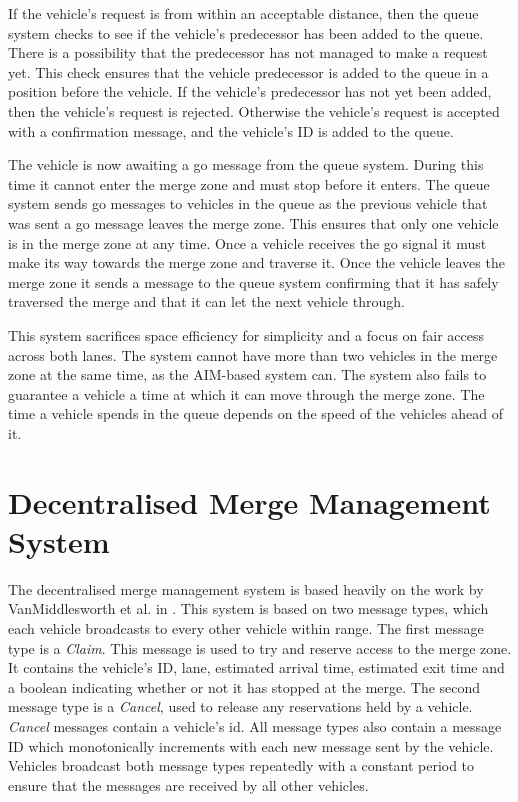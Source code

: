 If the vehicle's request is from within an acceptable distance, then the queue system checks to see if the vehicle's predecessor has been added to the queue. There is a possibility that the predecessor has not managed to make a request yet. This check ensures that the vehicle predecessor is added to the queue in a position before the vehicle. If the vehicle's predecessor has not yet been added, then the vehicle's request is rejected. Otherwise the vehicle's request is accepted with a confirmation message, and the vehicle's ID is added to the queue.

The vehicle is now awaiting a go message from the queue system. During this time it cannot enter the merge zone and must stop before it enters. The queue system sends go messages to vehicles in the queue as the previous vehicle that was sent a go message leaves the merge zone. This ensures that only one vehicle is in the merge zone at any time. Once a vehicle receives the go signal it must make its way towards the merge zone and traverse it. Once the vehicle leaves the merge zone it sends a message to the queue system confirming that it has safely traversed the merge and that it can let the next vehicle through.

This system sacrifices space efficiency for simplicity and a focus on fair access across both lanes. The system cannot have more than two vehicles in the merge zone at the same time, as the AIM-based system can. The system also fails to guarantee a vehicle a time at which it can move through the merge zone. The time a vehicle spends in the queue depends on the speed of the vehicles ahead of it.

\section{Decentralised Merge Management System}
\label{sec:Decentralised Merge Management System}
The decentralised merge management system is based heavily on the work by VanMiddlesworth et al. in  \citep{VanMiddlesworth2008}. This system is based on two message types, which each vehicle broadcasts to every other vehicle within range. The first message type is a \emph{Claim}. This message is used to try and reserve access to the merge zone. It contains the vehicle's ID, lane, estimated arrival time, estimated exit time and a boolean indicating whether or not it has stopped at the merge. The second message type is a \emph{Cancel}, used to release any reservations held by a vehicle. \emph{Cancel} messages contain a vehicle's id. All message types also contain a message ID which monotonically increments with each new message sent by the vehicle. Vehicles broadcast both message types repeatedly with a constant period to ensure that the messages are received by all other vehicles. 

